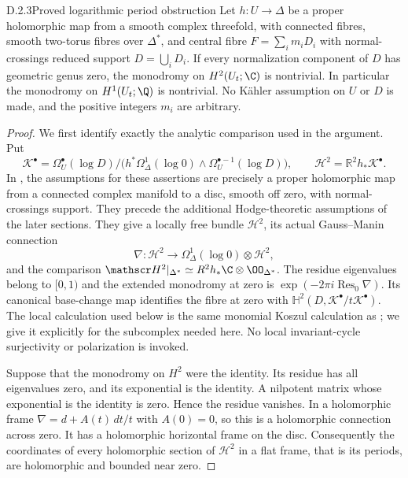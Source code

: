 \begin{idstatement}{D.2.3}{Proved logarithmic period obstruction}
\label{st:D.2.3}
Let $h:U\to\Delta$ be a proper holomorphic map from a smooth
complex threefold, with connected fibres, smooth two-torus fibres
over $\Delta^*$, and central fibre $F=\sum_i m_iD_i$ with
normal-crossings reduced support $D=\bigcup_iD_i$.
If every normalization component of $D$ has geometric genus zero,
the monodromy on $H^2(U_t;\C)$ is nontrivial. In particular the
monodromy on $H^1(U_t;\Q)$ is nontrivial. No K\"ahler assumption
on $U$ or $D$ is made, and the positive integers $m_i$ are arbitrary.
\end{idstatement}
\begin{proof}
We first identify exactly the analytic comparison used in the
argument. Put
\[
\mathscr K^\bullet=
 \Omega_U^\bullet(\log D)\big/
 \bigl(h^*\Omega_\Delta^1(\log0)\wedge
       \Omega_U^{\bullet-1}(\log D)\bigr),\qquad
\mathscr H^2=\mathbb R^2h_*\mathscr K^\bullet.
\]
In \cite[\S2.1, Theorem~2.18, \S2.19, Proposition~2.20 and
Theorem~2.21]{Steenbrink1976}, the assumptions for these assertions
are precisely a proper holomorphic map from a connected complex
manifold to a disc, smooth off zero, with normal-crossings support.
They precede the additional Hodge-theoretic assumptions of the
later sections. They give a locally free bundle $\mathscr H^2$,
its actual Gauss--Manin connection
\[
\nabla:\mathscr H^2\longrightarrow
\Omega_\Delta^1(\log0)\otimes\mathscr H^2,
\]
and the comparison
$\mathscr H^2|_{\Delta^*}\simeq
R^2h_*\C\otimes\OO_{\Delta^*}$.
The residue eigenvalues belong to $[0,1)$ and the extended
monodromy at zero is
$\exp(-2\pi i\operatorname{Res}_0\nabla)$.
Its canonical base-change map identifies the fibre at zero with
$\mathbb H^2(D,\mathscr K^\bullet/t\mathscr K^\bullet)$.
The local calculation used below is the same monomial Koszul
calculation as \cite[Proposition~1.13 and proof of
Proposition~2.20]{Steenbrink1976}; we give it explicitly for the
subcomplex needed here. No local invariant-cycle surjectivity
or polarization is invoked.

Suppose that the monodromy on $H^2$ were the identity. Its
residue has all eigenvalues zero, and its exponential is the
identity. A nilpotent matrix whose exponential is the identity
is zero. Hence the residue vanishes. In a holomorphic frame
$\nabla=d+A(t)\,dt/t$ with $A(0)=0$, so this is a holomorphic
connection across zero. It has a holomorphic horizontal frame
on the disc. Consequently the coordinates of every holomorphic
section of $\mathscr H^2$ in a flat frame, that is its periods,
are holomorphic and bounded near zero.


\end{proof}
